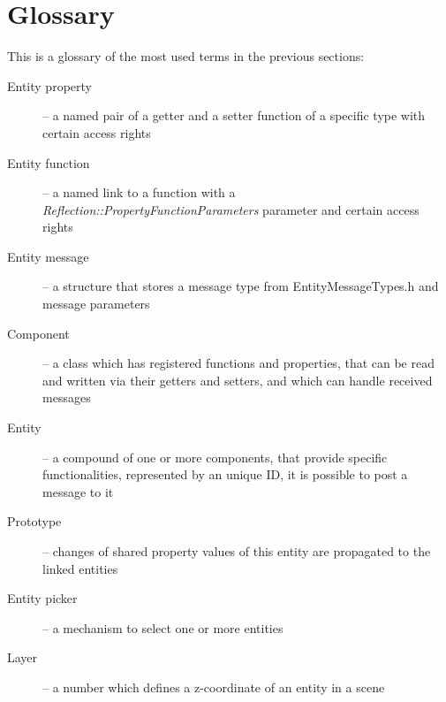 \section{Glossary}

This is a glossary of the most used terms in the previous sections:

\begin{description}
  \item[Entity property] -- a named pair of a getter and a setter function of a specific type with certain access rights
  \item[Entity function] -- a named link to a function with a \emph{Reflection::Property\-FunctionParameters} parameter and certain access rights
  \item[Entity message] -- a structure that stores a message type from EntityMessageTypes.h and message parameters
  \item[Component] -- a class which has registered functions and properties, that can be read and written via their getters and setters, and which can handle received messages
  \item[Entity] -- a compound of one or more components, that provide specific functionalities, represented by an unique ID, it is possible to post a message to it
  \item[Prototype] -- changes of shared property values of this entity are propagated to the linked entities
  \item[Entity picker] -- a mechanism to select one or more entities
  \item[Layer] -- a number which defines a z-coordinate of an entity in a scene
\end{description}